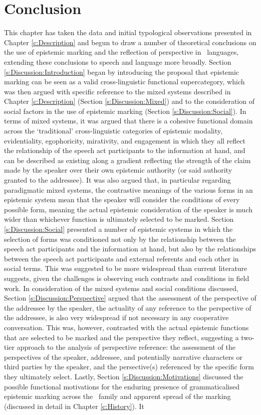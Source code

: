 \section{Conclusion}
This chapter has taken the data and initial typological observations presented in Chapter \ref{c:Description} and begun to draw a number of theoretical conclusions on the use of epistemic marking and the reflection of perspective in \lfam\ languages, extending these conclusions to speech and language more broadly. Section \ref{s:Discussion:Introduction} began by introducing the proposal that epistemic marking can be seen as a valid cross-linguistic functional supercategory, which was then argued with specific reference to the mixed systems described in Chapter \ref{c:Description} (Section \ref{s:Discussion:Mixed}) and to the consideration of social factors in the use of epistemic marking (Section \ref{s:Discussion:Social}). In terms of mixed systems, it was argued that there is a cohesive functional domain across the `traditional' cross-linguistic categories of epistemic modality, evidentiality, egophoricity, mirativity, and engagement in which they all reflect the relationship of the speech act participants to the information at hand, and can be described as existing along a gradient reflecting the strength of the claim made by the speaker over their own epistemic authority (or said authority granted to the addressee). It was also argued that, in particular regarding paradigmatic mixed systems, the contrastive meanings of the various forms in an epistemic system mean that the speaker will consider the conditions of every possible form, meaning the actual epistemic consideration of the speaker is much wider than whichever function is ultimately selected to be marked. Section \ref{s:Discussion:Social} presented a number of epistemic systems in which the selection of forms was conditioned not only by the relationship between the speech act participants and the information at hand, but also by the relationships between the speech act participants and external referents and each other in social terms. This was suggested to be more widespread than current literature suggests, given the challenges is observing such contrasts and conditions in field work. In consideration of the mixed systems and social conditions discussed, Section \ref{s:Discussion:Perspective} argued that the assessment of the perspective of the addressee by the speaker, the actuality of any reference to the perspective of the addressee, is also very widespread if not necessary in any cooperative conversation. This was, however, contrasted with the actual epistemic functions that are selected to be marked and the perspective they reflect, suggesting a two-tier approach to the analysis of perspective reference: the assessment of the perspectives of the speaker, addressee, and potentially narrative characters or third parties by the speaker, and the persective(s) referenced by the specific form they ultimately select. Lastly, Section \ref{s:Discussion:Motivations} discussed the possible functional motivations for the enduring presence of grammaticalised epistemic marking across the \lfam\ family and apparent spread of the marking (discussed in detail in Chapter \ref{c:History}). It 